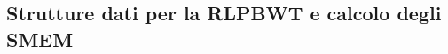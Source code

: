 \documentclass[]{beamer}
\def\len{\mbox{\rm {\sf len}}}
\def\row{\mbox{\rm {\sf row}}}
\def\RLCP{\mbox{\rm {\sf RLCP}}}
\def\MS{\mbox{\rm {\sf MS}}}
\def\PBWT{\mbox{\rm {\sf PBWT}}}
\def\SMEM{\mbox{\rm {\sf SMEM}}}
\begin{document}
\subsection{Strutture dati per la RLPBWT e calcolo degli SMEM}
\end{document}
